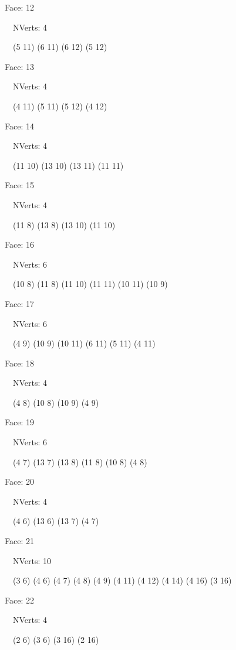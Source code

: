 \documentclass{article}
\begin{document}
{\footnotesize 

Face: 12

\   \    NVerts: 4

 \   \   (5 11) (6 11) (6 12) (5 12)}

{\footnotesize 

Face: 13

\   \    NVerts: 4

 \   \   (4 11) (5 11) (5 12) (4 12)}

{\footnotesize 

Face: 14

\   \    NVerts: 4

 \   \   (11 10) (13 10) (13 11) (11 11)}

{\footnotesize 

Face: 15

\   \    NVerts: 4

 \   \   (11 8) (13 8) (13 10) (11 10)}

{\footnotesize 

Face: 16

\   \    NVerts: 6

 \   \   (10 8) (11 8) (11 10) (11 11) (10 11) (10 9)}

{\footnotesize 

Face: 17

\   \    NVerts: 6

 \   \   (4 9) (10 9) (10 11) (6 11) (5 11) (4 11)}

{\footnotesize 

Face: 18

\   \    NVerts: 4

 \   \   (4 8) (10 8) (10 9) (4 9)}

{\footnotesize 

Face: 19

\   \    NVerts: 6

 \   \   (4 7) (13 7) (13 8) (11 8) (10 8) (4 8)}

{\footnotesize 

Face: 20

\   \    NVerts: 4

 \   \   (4 6) (13 6) (13 7) (4 7)}

{\footnotesize 

Face: 21

\   \    NVerts: 10

 \   \   (3 6) (4 6) (4 7) (4 8) (4 9) (4 11) (4 12) (4 14) (4 16) (3 16)}

{\footnotesize 

Face: 22

\   \    NVerts: 4

 \   \   (2 6) (3 6) (3 16) (2 16)}
\end{document}
